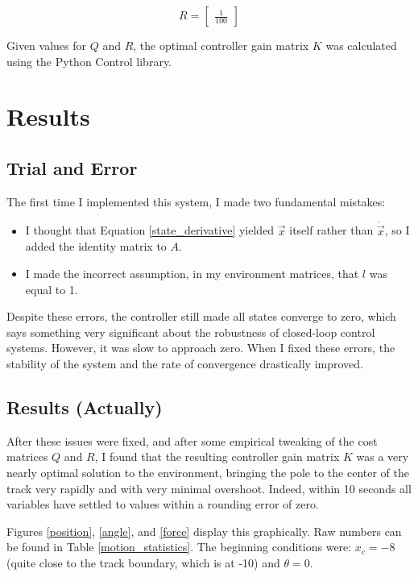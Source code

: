 \documentclass[12pt]{article}
\begin{document}
\begin{equation}
    R = \begin{bmatrix}
        \displaystyle
        \frac{1}{100}
    \end{bmatrix}
\end{equation}

Given values for $Q$ and $R$, the optimal controller gain matrix $K$ was calculated using the Python Control library.

\section{Results}

\subsection{Trial and Error}

The first time I implemented this system, I made two fundamental mistakes:

\begin{itemize}
    \item I thought that Equation \ref{state_derivative} yielded $\vec{x}$ itself rather than $\dot{\vec{x}}$, so I added the identity matrix to $A$.
    \item I made the incorrect assumption, in my environment matrices, that $l$ was equal to 1.
\end{itemize}

Despite these errors, the controller still made all states converge to zero, which says something very significant about the robustness of closed-loop control systems. However, it was slow to approach zero. When I fixed these errors, the stability of the system and the rate of convergence drastically improved.

\subsection{Results (Actually)}

After these issues were fixed, and after some empirical tweaking of the cost matrices $Q$ and $R$, I found that the resulting controller gain matrix $K$ was a very nearly optimal solution to the environment, bringing the pole to the center of the track very rapidly and with very minimal overshoot. Indeed, within 10 seconds all variables have settled to values within a rounding error of zero.

Figures \ref{position}, \ref{angle}, and \ref{force} display this graphically. Raw numbers can be found in Table \ref{motion_statistics}. The beginning conditions were: $x _c = -8$ (quite close to the track boundary, which is at -10) and $\theta = 0$.
\end{document}
